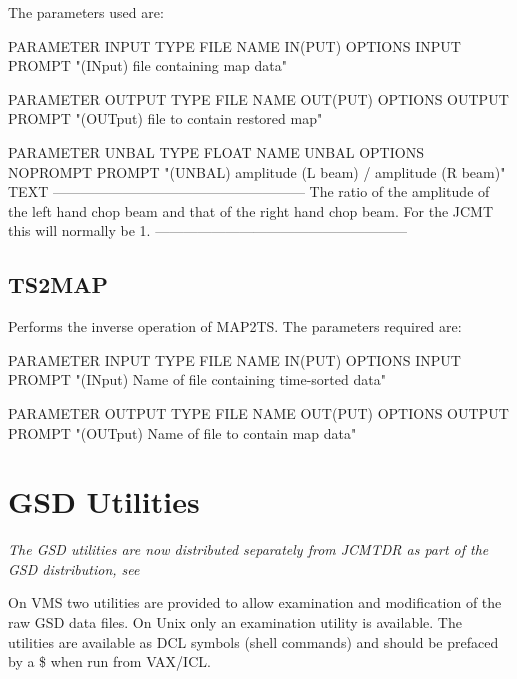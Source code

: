 \documentclass[twoside,11pt,nolof]{starlink}
\begin{document}
\goodbreak

The parameters used are:

\begin{small}
\begin{terminalv}
PARAMETER  INPUT
  TYPE    FILE
  NAME    IN(PUT)
  OPTIONS INPUT
  PROMPT  "(INput) file containing map data"

PARAMETER  OUTPUT
  TYPE    FILE
  NAME    OUT(PUT)
  OPTIONS OUTPUT
  PROMPT  "(OUTput) file to contain restored map"

PARAMETER  UNBAL
  TYPE    FLOAT
  NAME    UNBAL
  OPTIONS NOPROMPT
  PROMPT  "(UNBAL) amplitude (L beam) / amplitude (R beam)"
  TEXT    ------------------------------------------------------
          The ratio of the amplitude of the left hand chop beam
          and that of the right hand chop beam. For the JCMT this
          will normally be 1.
          ------------------------------------------------------
\end{terminalv}
\end{small}


\goodbreak

\subsection{TS2MAP}

Performs the inverse operation of MAP2TS. The parameters required are:

\begin{small}
\begin{terminalv}
PARAMETER  INPUT
  TYPE    FILE
  NAME    IN(PUT)
  OPTIONS INPUT
  PROMPT  "(INput) Name of file containing time-sorted data"

PARAMETER  OUTPUT
  TYPE    FILE
  NAME    OUT(PUT)
  OPTIONS OUTPUT
  PROMPT  "(OUTput) Name of file to contain map data"
\end{terminalv}
\end{small}


\goodbreak

\section{GSD Utilities}

\textit{The GSD utilities are now distributed separately from JCMTDR
as part of the GSD distribution, see }

On VMS two utilities are provided to allow examination and  modification of
the raw GSD data files. On Unix only an examination utility is
available.
The utilities are available as DCL symbols (shell commands) and should
be prefaced by a \$ when run from VAX/ICL.
\end{document}
